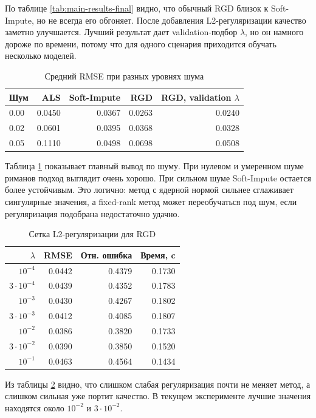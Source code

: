 \documentclass[a4paper,12pt]{article}
\begin{document}
По таблице \ref{tab:main-results-final} видно, что обычный RGD близок к Soft-Impute, но не всегда его обгоняет. После добавления L2-регуляризации качество заметно улучшается. Лучший результат дает validation-подбор $\lambda$, но он намного дороже по времени, потому что для одного сценария приходится обучать несколько моделей.

\begin{table}[H]
\centering
\small
\caption{Средний RMSE при разных уровнях шума}
\label{tab:noise-results-final}
\begin{tabular}{lrrrr}
\toprule
Шум & ALS & Soft-Impute & RGD & RGD, validation $\lambda$ \\
\midrule
0.00 & 0.0450 & 0.0367 & 0.0263 & 0.0240 \\
0.02 & 0.0601 & 0.0395 & 0.0368 & 0.0328 \\
0.05 & 0.1110 & 0.0498 & 0.0698 & 0.0508 \\
\bottomrule
\end{tabular}
\end{table}

Таблица \ref{tab:noise-results-final} показывает главный вывод по шуму. При нулевом и умеренном шуме риманов подход выглядит очень хорошо. При сильном шуме Soft-Impute остается более устойчивым. Это логично: метод с ядерной нормой сильнее сглаживает сингулярные значения, а fixed-rank метод может переобучаться под шум, если регуляризация подобрана недостаточно удачно.

\begin{table}[H]
\centering
\small
\caption{Сетка L2-регуляризации для RGD}
\label{tab:l2-sweep-final}
\begin{tabular}{rrrr}
\toprule
$\lambda$ & RMSE & Отн. ошибка & Время, c \\
\midrule
$10^{-4}$ & 0.0442 & 0.4379 & 0.1730 \\
$3\cdot10^{-4}$ & 0.0439 & 0.4352 & 0.1783 \\
$10^{-3}$ & 0.0430 & 0.4267 & 0.1802 \\
$3\cdot10^{-3}$ & 0.0412 & 0.4085 & 0.1807 \\
$10^{-2}$ & 0.0386 & 0.3820 & 0.1733 \\
$3\cdot10^{-2}$ & 0.0390 & 0.3850 & 0.1520 \\
$10^{-1}$ & 0.0463 & 0.4564 & 0.1434 \\
\bottomrule
\end{tabular}
\end{table}

Из таблицы \ref{tab:l2-sweep-final} видно, что слишком слабая регуляризация почти не меняет метод, а слишком сильная уже портит качество. В текущем эксперименте лучшие значения находятся около $10^{-2}$ и $3\cdot10^{-2}$.
\end{document}
